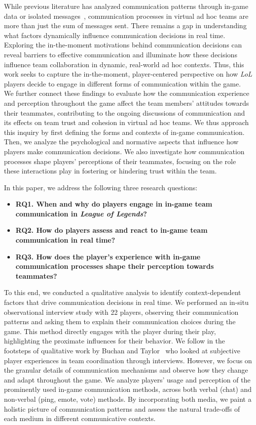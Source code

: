 While previous literature has analyzed communication patterns through in-game data or isolated messages~\cite{tan2021less, tan2022}, communication processes in virtual ad hoc teams are more than just the sum of messages sent. There remains a gap in understanding what factors dynamically influence communication decisions in real time. Exploring the in-the-moment motivations behind communication decisions can reveal barriers to effective communication and illuminate how these decisions influence team collaboration in dynamic, real-world ad hoc contexts. Thus, this work seeks to capture the in-the-moment, player-centered perspective on how \textit{LoL} players decide to engage in different forms of communication within the game. We further connect these findings to evaluate how the communication experience and perception throughout the game affect the team members' attitudes towards their teammates, contributing to the ongoing discussions of communication and its effects on team trust and cohesion in virtual ad hoc teams. We thus approach this inquiry by first defining the forms and contexts of in-game communication. Then, we analyze the psychological and normative aspects that influence how players make communication decisions. We also investigate how communication processes shape players' perceptions of their teammates, focusing on the role these interactions play in fostering or hindering trust within the team.

In this paper, we address the following three research questions:
\begin{itemize}
    \item \textbf{RQ1. When and why do players engage in in-game team communication in \textit{League of Legends}?}
    \item \textbf{RQ2. How do players assess and react to in-game team communication in real time?}
    \item \textbf{RQ3. How does the player's experience with in-game communication processes shape their perception towards teammates?}
\end{itemize}

To this end, we conducted a qualitative analysis to identify context-dependent factors that drive communication decisions in real time. We performed an in-situ observational interview study with 22 players, observing their communication patterns and asking them to explain their communication choices during the game. This method directly engages with the player during their play, highlighting the proximate influences for their behavior. We follow in the footsteps of qualitative work by Buchan and Taylor~\cite{buchan2016} who looked at subjective player experiences in team coordination through interviews. However, we focus on the granular details of communication mechanisms and observe how they change and adapt throughout the game. We analyze players' usage and perception of the prominently used in-game communication methods, across both verbal (chat) and non-verbal (ping, emote, vote) methods. By incorporating both media, we paint a holistic picture of communication patterns and assess the natural trade-offs of each medium in different communicative contexts.

